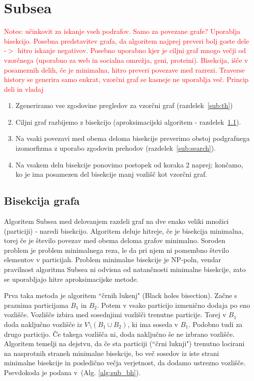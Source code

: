 \documentclass[a4paper, 12pt, ]{book}
\newcommand{\TODO}[1]{\textcolor{red}{#1}}
\newcommand{\refalg}[1]{(Alg. \ref{#1})}
\begin{document}
\chapter{Subsea}
	\TODO{Notes: učinkovit za iskanje vseh podrafov. Samo za povezane grafe? Uporablja bisekcijo. Posebna predstavitev grafa, da algoritem najprej 
	preveri bolj goste dele -$>$ hitro iskanje negativov. Posebno uporabno kjer je ciljni graf mnogo večji od vzorčnega (uporabno za web in socialna omrežja,
	geni,	proteini).	
	Bisekcija, išče v posameznih delih, če je minimalna, hitro preveri povezave med razrezi. Traverse history se generira samo enkrat, vzorčni graf se
	kasneje ne uporablja več.
	Princip deli in vladaj}

	\begin{enumerate}
		\item Zgeneriramo vse zgodovine pregledov za vzorčni graf (razdelek~\ref{sub:th})
		\item Ciljni graf razbijemo z bisekcijo (aproksimacijski algoritem - razdelek~\ref{sub:bisect}).
		\item Na vsaki povezavi med obema deloma bisekcije preverimo obstoj podgrafnega izomorfizma z uporabo zgodovin prehodov 
			(razdelek~\ref{sub:search}).
		\item Na vsakem delu bisekcije ponovimo postopek od koraka 2 naprej; končamo, ko je ima posamezen del bisekcije manj vozlišč kot vzorčni graf.
	\end{enumerate}

	\section{Bisekcija grafa}
	\label{sub:bisect}
	Algoritem Subsea med delovanjem razdeli graf na dve enako veliki množici (particiji) - naredi bisekcijo. Algoritem deluje hitreje, če je bisekcija 
	minimalna, torej če je število povezav med obema deloma grafov minimalno. Soroden problem je problem minimalnega reza, le da pri njem ni 
	pomembno število elementov v particijah. Problem minimalne bisekcije je NP-poln, vendar pravilnost algoritma Subsea ni odvisna od natančnosti
	minimalne bisekcije, zato se uporabljajo hitre aproksimacijske metode.

	Prva taka metoda je  algoritem ``črnih lukenj" (Black holes bisection). Začne s praznima particijama $B_1$ in $B_2$. Potem v vsako particijo izmenično
	dodaja po eno vozlišče.
	Vozlišče izbira med sosednjimi vozlišči trenutne particije. Torej v $B_1$ doda naključno vozlišče iz $V \setminus (B_1 \cup B_2)$, ki ima soseda v $B_1$.
	Podobno tudi za drugo particijo. Če takega vozlišča ni, doda naključno še ne izbrano vozlišče. Algoritem temelji na dejstvu, da če sta particiji (``črni 
	luknji") trenutno locirani na 	nasprotnih straneh minimalne bisekcije, bo več sosedov iz iste strani minimalne bisekcije in posledično večja verjetnost, da
	dodamo ustrezno vozlišče. Psevdokoda je podana v~\refalg{alg:sub_bh}.
\end{document}
